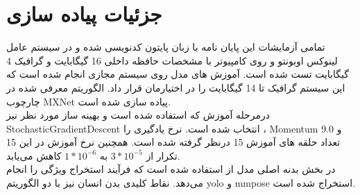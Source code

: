  \section{‌جزئیات پیاده سازی}\label{zojiyate_piyade}
تمامی آزمایشات این پایان نامه با زبان پایتون کدنویسی شده و در سیستم عامل لینوکس اوبونتو و روی کامپیوتر با مشخصات حافظه داخلی 16 گیگابایت و گرافیک 4 گیگابایت تست شده است. آموزش های مدل روی سیستم مجازی %
انجام شده است که این سیستم گرافیک تا 14 گیگابایت را در اختیارمان قرار داد. الگوریتم معرفی شده در چارچوب MXNet پیاده سازی شده است.\\
درمرحله آموزش %
که استفاده شده %
است و بهینه ساز مورد نظر نیز‌ %
\gls{StochasticGradientDescent}
انتخاب شده است. نرخ یادگیری را %
 ،  %
 \gls{Momentum}
 9.0
 و تعداد حلقه های آموزش 15 درنظر گرفته شده است. همچنین نرخ آموزش در این 15 تکرار از $3*10^{-5}$ به $1*10^{-6}$ کاهش می‌یابد.\\
در بخش بدنه اصلی مدل از %
استفاده شده است که فرآیند استخراج ویژگی را انجام می‌دهد. نقاط کلیدی بدن انسان نیز با دو الگوریتم yolo و mmpose استخراج شده است.
